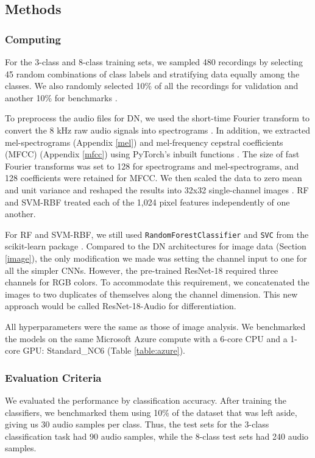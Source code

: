 \subsection{Methods}
\subsubsection{Computing}
For the 3-class and 8-class training sets, we sampled 480 recordings by selecting 45 random combinations of class labels and stratifying data equally among the classes. We also randomly selected 10\% of all the recordings for validation and another 10\% for benchmarks \citep{nasr, tian}.

To preprocess the audio files for DN, we used the short-time Fourier transform to convert the 8 kHz raw audio signals into spectrograms \citep{wyse}. In addition, we extracted mel-spectrograms (Appendix \ref{mel}) and mel-frequency cepstral coefficients (MFCC) (Appendix \ref{mfcc}) using PyTorch's inbuilt functions \citep{pytorch}.
The size of fast Fourier transforms was set to 128 for spectrograms and mel-spectrograms, and 128 coefficients were retained for MFCC. We then scaled the data to zero mean and unit variance and reshaped the results into 32x32 single-channel images \citep{lecun2012efficient}. RF and SVM-RBF treated each of the 1,024 pixel features independently of one another.

For RF and SVM-RBF, we still used \texttt{RandomForestClassifier} and \texttt{SVC} from the scikit-learn package \citep{scikit-learn}. Compared to the DN architectures for image data (Section \ref{image}), the only modification we made was setting the channel input to one for all the simpler CNNs. However, the pre-trained ResNet-18 required three channels for RGB colors. To accommodate this requirement, we concatenated the images to two duplicates of themselves along the channel dimension. This new approach would be called ResNet-18-Audio for differentiation.

All hyperparameters were the same as those of image analysis. We benchmarked the models on the same Microsoft Azure compute with a 6-core CPU and a 1-core GPU: Standard\_NC6 (Table \ref{table:azure}).

\subsubsection{Evaluation Criteria}
We evaluated the performance by classification accuracy. After training the classifiers, we benchmarked them using 10\% of the dataset that was left aside, giving us 30 audio samples per class.
Thus, the test sets for the 3-class classification task had 90 audio samples, while the 8-class test sets had 240 audio samples.

